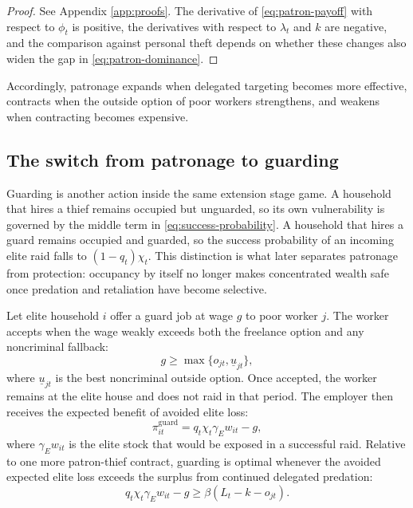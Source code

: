 \begin{proof}
See Appendix \ref{app:proofs}. The derivative of \eqref{eq:patron-payoff} with respect to $\phi_t$ is positive, the derivatives with respect to $\lambda_t$ and $k$ are negative, and the comparison against personal theft depends on whether these changes also widen the gap in \eqref{eq:patron-dominance}.
\end{proof}

Accordingly, patronage expands when delegated targeting becomes more effective, contracts when the outside option of poor workers strengthens, and weakens when contracting becomes expensive.

\subsection{The switch from patronage to guarding}

Guarding is another action inside the same extension stage game. A household that hires a thief remains occupied but unguarded, so its own vulnerability is governed by the middle term in \eqref{eq:success-probability}. A household that hires a guard remains occupied and guarded, so the success probability of an incoming elite raid falls to $(1-q_t)\chi_t$. This distinction is what later separates patronage from protection: occupancy by itself no longer makes concentrated wealth safe once predation and retaliation have become selective.

Let elite household $i$ offer a guard job at wage $g$ to poor worker $j$. The worker accepts when the wage weakly exceeds both the freelance option and any noncriminal fallback:
\begin{equation}
g \ge \max\{o_{jt}, \underline{u}_{jt}\},
\label{eq:guard-IR}
\end{equation}
where $\underline{u}_{jt}$ is the best noncriminal outside option. Once accepted, the worker remains at the elite house and does not raid in that period. The employer then receives the expected benefit of avoided elite loss:
\begin{equation}
\pi^{\mathrm{guard}}_{it} = q_t \chi_t \gamma_E w_{it} - g,
\label{eq:guard-payoff}
\end{equation}
where $\gamma_E w_{it}$ is the elite stock that would be exposed in a successful raid. Relative to one more patron-thief contract, guarding is optimal whenever the avoided expected elite loss exceeds the surplus from continued delegated predation:
\begin{equation}
q_t \chi_t \gamma_E w_{it} - g \ge \beta\left(L_t - k - o_{jt}\right).
\label{eq:guard-dominance}
\end{equation}

